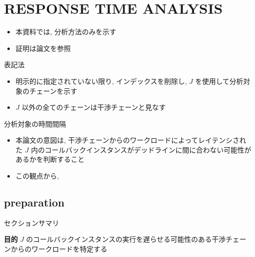 

\section{RESPONSE TIME ANALYSIS}
\label{sec: responce_time_analysis}

\begin{frame}{}
    \begin{itemize}
        \item 本資料では, 分析方法のみを示す
        \item 証明は論文を参照
    \end{itemize}
\end{frame}

\begin{frame}{表記法}
    \begin{itemize}
        \item 明示的に指定されていない限り, インデックスを削除し, $J$ を使用して分析対象のチェーンを示す
        \item $J$ 以外の全てのチェーンは干渉チェーンと見なす
    \end{itemize}
\end{frame}

\begin{frame}{分析対象の時間間隔}
    \begin{itemize}
        \item 本論文の意図は, 干渉チェーンからのワークロードによってレイテンシされた $J$ 内のコールバックインスタンスがデッドラインに間に合わない可能性があるかを判断すること
        \item この観点から, \tb{時間間隔 $\left[r, \min \left\{s_{|J|}, r+D\right\}\right)$ を $J$ の\al{問題ウィンドウ}とし,}\\ 
    \end{itemize}
\end{frame}


\subsection{preparation}
\label{ssec: preparation}

\begin{frame}{セクションサマリ}
    \begin{itembox}[l]{\textbf{目的}}
        $J$ のコールバックインスタンスの実行を遅らせる可能性のある干渉チェーンからのワークロードを特定する
    \end{itembox}
\end{frame}

